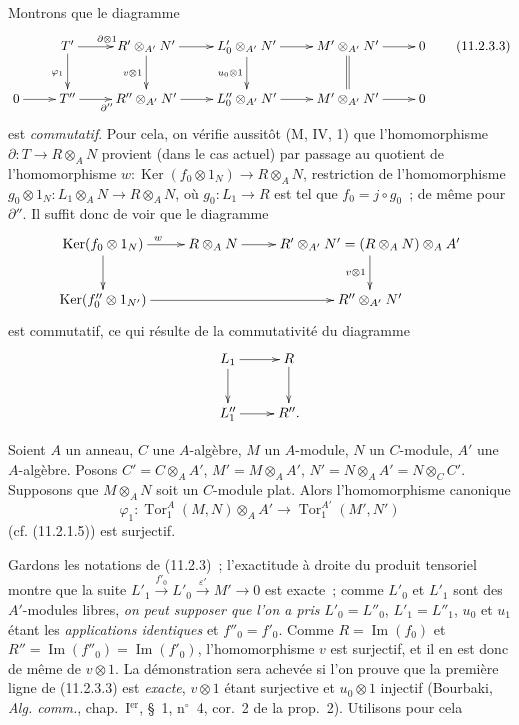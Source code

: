 Montrons que le diagramme
\begin{equation}
\xymatrix{
&T'\ar[r]^{\partial\otimes1}\ar[d]_{\varphi_1}&
R'\otimes_{A'}N'\ar[r]\ar[d]_{v\otimes1}&
L'_0\otimes_{A'}N'\ar[r]\ar[d]_{u_0\otimes1}&
M'\otimes_{A'}N'\ar[r]\ar@{=}[d]&0\\
0\ar[r]&T''\ar[r]_{\partial''}&R''\otimes_{A'}N'\ar[r]&
L''_0\otimes_{A'}N'\ar[r]&M'\otimes_{A'}N'\ar[r]&0
}
\label{IV.11.2.3.3-fr}
\tag{11.2.3.3}
\end{equation}
est \emph{commutatif}. Pour cela, on vérifie aussitôt (M, IV, 1) que
l'homomorphisme $\partial:T\to R\otimes_AN$ provient (dans le cas actuel)
par passage au quotient de l'homomorphisme
$w:\operatorname{Ker}(f_0\otimes1_N)\to R\otimes_AN$, restriction de
l'homomorphisme $g_0\otimes1_N:L_1\otimes_AN\to R\otimes_AN$, où
$g_0:L_1\to R$ est tel que $f_0=j\circ g_0$~; de même pour $\partial''$.
Il suffit donc de voir que le diagramme
\[
\xymatrix{
\operatorname{Ker}(f_0\otimes1_N)\ar[r]^w\ar[d]&R\otimes_AN\ar[r]&
R'\otimes_{A'}N'=(R\otimes_AN)\otimes_AA'\ar[d]_{v\otimes1}\\
\operatorname{Ker}(f''_0\otimes1_{N'})\ar[rr]&&R''\otimes_{A'}N'
}
\]
est commutatif, ce qui résulte de la commutativité du diagramme
\[
\xymatrix{
L_1\ar[r]\ar[d]&R\ar[d]\\
L''_1\ar[r]&R''.
}
\]

\begin{lemma}[11.2.4]
\label{IV.11.2.4-fr}
Soient $A$ un anneau, $C$ une $A$-algèbre, $M$ un $A$-module, $N$ un
$C$-module, $A'$ une $A$-algèbre. Posons $C'=C\otimes_AA'$,
$M'=M\otimes_AA'$, $N'=N\otimes_AA'=N\otimes_CC'$. Supposons que
$M\otimes_AN$ soit un $C$-module plat. Alors l'homomorphisme canonique
\[
\varphi_1:\operatorname{Tor}_1^A(M,N)\otimes_AA'
\to\operatorname{Tor}_1^{A'}(M',N')
\]
(cf. (11.2.1.5)) est surjectif.
\end{lemma}

Gardons les notations de (11.2.3)~; l'exactitude à droite du produit
tensoriel montre que la suite
$L'_1\xrightarrow{f'_0}L'_0\xrightarrow{\varepsilon'}M'\to0$ est exacte~;
comme $L'_0$ et $L'_1$ sont des $A'$-modules libres, \emph{on peut supposer
que l'on a pris} $L'_0=L''_0$, $L'_1=L''_1$, $u_0$ et $u_1$ étant les
\emph{applications identiques} et $f''_0=f'_0$. Comme
$R=\operatorname{Im}(f_0)$ et $R''=\operatorname{Im}(f''_0)=
\operatorname{Im}(f'_0)$, l'homomorphisme $v$ est surjectif, et il en est
donc de même de $v\otimes1$. La démonstration sera achevée si l'on prouve que
la première ligne de (11.2.3.3) est \emph{exacte}, $v\otimes1$ étant
surjective et $u_0\otimes1$ injectif (Bourbaki, \emph{Alg. comm.},
chap.~I$^{\mathrm{er}}$, \S~1, n$^\circ$~4, cor.~2 de la prop.~2).
Utilisons pour cela

